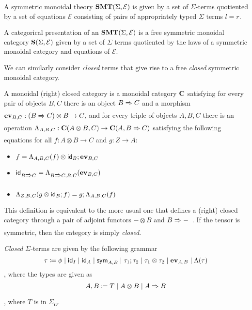 \begin{definition}

A symmetric monoidal theory $\mathbf{SMT}(\Sigma, \mathcal{E})$ is given by a set of $\Sigma$-terms quotiented by a set of equations $\mathcal{E}$ consisting of pairs of appropriately typed $\Sigma$ terms $l = r$.
\end{definition}

\begin{definition}
A categorical presentation of an $\mathbf{SMT}(\Sigma, \mathcal{E})$ is a free symmetric monoidal category $\mathbf{S}(\Sigma, \mathcal{E})$ given by a set of $\Sigma$ terms quotiented by the laws of a symmetric monoidal category and equations of $\mathcal{E}$.
\end{definition}

We can similarly consider \textit{closed} terms that give rise to a free \textit{closed} symmetric monoidal category.

\begin{definition}
\label{def:closed}
A monoidal (right) closed category is a monoidal category $\mathbf{C}$ satisfying for
every pair of objects $B,C$ there is an object $B \xRightarrow{} C$ and a morphism $\textbf{ev}_{B,C} : (B \xRightarrow{} C) \otimes B \to
C$, and for every triple of objects $A,B,C$ there is an operation $\Lambda_{A,B,C} : \mathbf{C}(A \otimes B,C) \to
\mathbf{C}(A,B \xRightarrow{} C)$ satisfying the following equations for all $f : A \otimes B \to C$ and $g : Z \to A$:
\begin{itemize}
\item $f = \Lambda_{A,B,C}(f) \otimes \textsf{id}_{B}; \textbf{ev}_{B,C}$
\item $\textsf{id}_{B \xRightarrow{} C} = \Lambda_{B \xRightarrow{} C,B,C}(\textbf{ev}_{B,C})$
\item $\Lambda_{Z,B,C}(g \otimes \textsf{id}_{B}; f) = g;\Lambda_{A,B,C}(f)$
\end{itemize}
\end{definition}

This definition is equivalent to the more usual one that defines a (right) closed category through a pair of adjoint functors $- \otimes B$ and $B \xRightarrow{} -$~\cite{ghica-zanassi2023string}.
If the tensor is symmetric, then the category is simply \textit{closed}.

\begin{definition}

\textit{Closed} $\Sigma$-terms are given by the following grammar
\[
    \tau \coloneq \phi \;|\; \textsf{id}_{I} \;|\; \textsf{id}_{A} \;|\; \textsf{sym}_{A,B} \;|\; \tau_{1};\tau_{2} \;|\; \tau_{1} \otimes \tau_{2} \; | \; \textbf{ev}_{A,B} \; | \; \Lambda(\tau)
\]
, where the types are given as
\[
A,B \coloneq T \;|\; A \otimes B \; | \; A \xRightarrow{} B
\], where $T$ is in $\Sigma_{O}$.
\end{definition}

